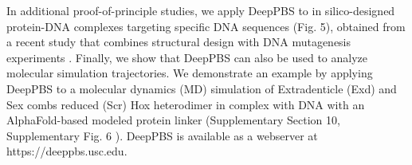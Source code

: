 \par
In additional proof-of-principle studies, we apply DeepPBS to in silico-designed protein-DNA complexes targeting specific DNA sequences (Fig. 5), obtained from a recent study that combines structural design with DNA mutagenesis experiments \citep{Glasscock2023}. Finally, we show that DeepPBS can also be used to analyze molecular simulation trajectories. We demonstrate an example by applying DeepPBS to a molecular dynamics (MD) simulation of Extradenticle (Exd) and Sex combs reduced (Scr) Hox heterodimer in complex with DNA \citep{Joshi2007} with an AlphaFold-based modeled protein linker (Supplementary Section 10, Supplementary Fig. 6 ). DeepPBS is available as a webserver at https://deeppbs.usc.edu.
\par
